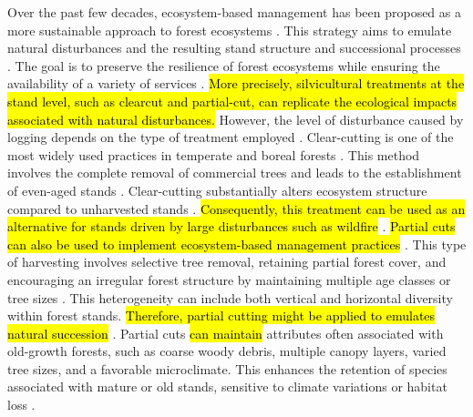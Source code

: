 Over the past few decades, ecosystem-based management has been proposed as a more sustainable approach to forest ecosystems \citep{Perry1998scientificbasis,Kuuluvainen2002Naturalvariabilitya}. 
This strategy aims to emulate natural disturbances and the resulting stand structure and successional processes \citep{Bergeron1999Forestmanagementa}. 
The goal is to preserve the resilience of forest ecosystems while ensuring the availability of a variety of services \citep{Szaro1998emergenceecosystem,MacDicken2015Globalprogress}. 
\hl{More precisely, silvicultural treatments at the stand level, such as clearcut and partial-cut, can replicate the ecological impacts associated with natural disturbances. }
However, the level of disturbance caused by logging depends on the type of treatment employed \citep{Harpole1999Effectsseven,Chaudhary2016Impactforest,Koivula2019Responsesboreal}. 
Clear-cutting is one of the most widely used practices in temperate and boreal forests \citep{Fedrowitz2014Canretention,Chaudhary2016Impactforest}. 
This method involves the complete removal of commercial trees and leads to the establishment of even-aged stands \citep{Brashears2004AssessmentCanopy,Martin2020Forestmanagement}. 
Clear-cutting substantially alters ecosystem structure compared to unharvested stands \citep{Hanski2000Extinctiondebt}. 
\hl{Consequently, this treatment can be used as an alternative for stands driven by large disturbances such as wildfire} \citep{Bergeron1999Forestmanagementa}. 
\hl{Partial cuts can also be used to implement ecosystem-based management practices} \citep{Bergeron1999Forestmanagementa,Raymond2009irregularshelterwood}. 
This type of harvesting involves selective tree removal, retaining partial forest cover, and encouraging an irregular forest structure by maintaining multiple age classes or tree sizes \citep{Raymond2009irregularshelterwood}. 
This heterogeneity can include both vertical and horizontal diversity within forest stands. 
\hl{Therefore, partial cutting might be applied to emulates natural succession} \citep{Bergeron1999Forestmanagementa}.
Partial cuts \hl{can maintain} attributes often associated with old-growth forests, such as coarse woody debris, multiple canopy layers, varied tree sizes, and a favorable microclimate. 
This enhances the retention of species associated with mature or old stands, sensitive to climate variations or habitat loss \citep{Hansen1991Conservingbiodiversity,Ameray2021Forestcarbon}. 

